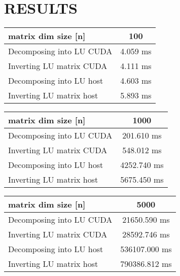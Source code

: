 
\section{RESULTS}\label{sec:results}

\begin{tabular}{|l|c|}
	\hline
	matrix dim size [n] & 100 \\
	\hline
	Decomposing into LU CUDA & 4.059 ms \\
	Inverting LU matrix CUDA & 4.111 ms \\
	\hline
	Decomposing into LU host & 4.603 ms \\
	Inverting LU matrix host & 5.893 ms \\		
	\hline
\end{tabular}


\begin{tabular}{|l|c|}
	\hline
	matrix dim size [n] & 1000 \\
	\hline
	Decomposing into LU CUDA & 201.610  ms \\
	Inverting LU matrix CUDA & 548.012 ms \\
	\hline
	Decomposing into LU host & 4252.740 ms \\
	Inverting LU matrix host & 5675.450 ms \\		
	\hline
\end{tabular}


\begin{tabular}{|l|c|}
	\hline
	matrix dim size [n] & 5000 \\
	\hline
	Decomposing into LU CUDA & 21650.590 ms\\
	Inverting LU matrix CUDA & 28592.746 ms\\
	\hline
	Decomposing into LU host & 536107.000 ms\\
	Inverting LU matrix host & 790386.812 ms\\		
	\hline
\end{tabular}


